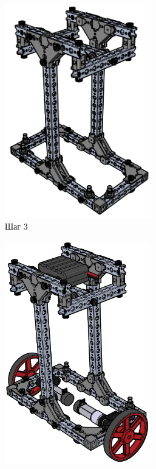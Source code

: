 \begin{figure}[h!]
\begin{subfigure}[b]{0.45\textwidth}
        \includegraphics[width=0.7\textwidth]{fig/assembly/3.3.png}
        \caption*{Шаг 3}
    \end{subfigure}
    \begin{subfigure}[b]{0.45\textwidth}
        \centering
        \includegraphics[width=0.7\textwidth]{fig/assembly/3.4.png}

\end{subfigure}
\end{figure}
